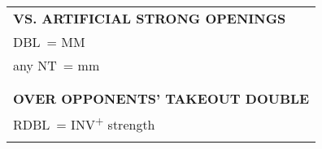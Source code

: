 \documentclass{article}
\newcommand\N{{\footnotesize NT}}
\newcommand{\+}{\textsuperscript{+}}
\newcommand{\X}{{\footnotesize{DBL}}}
\newcommand{\XX}{{\footnotesize{RDBL}}}
\newcommand{\m}{m}
\newcommand{\M}{M}
\newcommand{\mm}{mm}
\begin{document}
\begin{adjustbox}{valign=t,minipage={90mm}}
\begin{tabular}{|p{88mm}|}
      \\
      \\
      \hline
      \textbf{VS. ARTIFICIAL STRONG OPENINGS} \\ \hline
      \X\ = MM \\
      any \N\ = mm\\
      \\
      \\
      \hline
      \textbf{OVER OPPONENTS' TAKEOUT DOUBLE} \\ \hline
      \XX\ = INV\+ strength\\
      \rule{0pt}{14.4pt}\\
      \hline
    \end{tabular}
  \end{adjustbox}
%
\begin{minipage}{5mm}
  \begin{tabular}{| p{5mm} |}
  \end{tabular}
\end{minipage}
%
\end{document}
